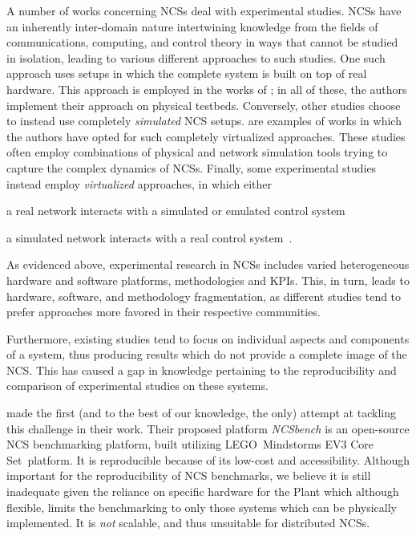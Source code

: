 A number of works concerning \acp{NCS} deal with experimental studies.
\acp{NCS} have an inherently inter-domain nature intertwining knowledge from the fields of communications, computing, and control theory in ways that cannot be studied in isolation, leading to various different approaches to such studies.
One such approach uses setups in which the complete system is built on top of real hardware.
This approach is employed in the works of  \textcite{Li2014Wireless,Baumann2018LowPower,Cuenca2019UAV}; in all of these, the authors implement their approach on physical testbeds.
Conversely, other studies choose to instead use completely \emph{simulated} \ac{NCS} setups.
\textcite{Wu2012NPC,Chen2015synccontrol,Ma2019DynamicSched} are examples of works in which the authors have opted for such completely virtualized approaches.
These studies often employ combinations of physical and network simulation tools trying to capture the complex dynamics of \acp{NCS}.
Finally, some experimental studies instead employ \emph{virtualized} approaches, in which either
\begin{enumerate*}[itemjoin={{; }}, itemjoin*={{; or }}]
    \item a real network interacts with a simulated or emulated control system~\cite{Wang2020VoltageControl}
    \item a simulated network interacts with a real control system~\cite{Natale2004InvPendEthernet}.
\end{enumerate*}

As evidenced above, experimental research in \acp{NCS} includes varied heterogeneous hardware and software platforms, methodologies and \aclp*{KPI}.
This, in turn, leads to hardware, software, and methodology fragmentation, as different studies tend to prefer approaches more favored in their respective communities.

Furthermore, existing studies tend to focus on individual aspects and components of a system, thus producing results which do not provide a complete image of the \ac{NCS}.
This has caused a gap in knowledge pertaining to the reproducibility and comparison of experimental studies on these systems.

\textcite{Zoppi2020NCSBench} made the first (and to the best of our knowledge, the only) attempt at tackling this challenge in their work.
Their proposed platform \emph{NCSbench} is an open-source \ac{NCS} benchmarking platform, built utilizing LEGO\textregistered{}\ Mindstorms EV3 Core Set\texttrademark{}\ platform. It is reproducible because of its low-cost and accessibility. Although important for the reproducibility of \ac{NCS} benchmarks, we believe it is still inadequate given the reliance on specific hardware for the Plant which although flexible, limits the benchmarking to only those systems which can be physically implemented.
It is \emph{not} scalable, and thus unsuitable for distributed \acp{NCS}.

